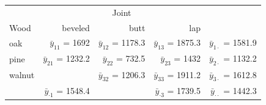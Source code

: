 \documentclass[addpoints]{examsetup}\usepackage[]{graphicx}\usepackage[]{color}
\begin{document}
\begin{questions}
\begin{table}[h]
\centering
\begin{tabular}{lrrrr}
   & \multicolumn{3}{c}{Joint} & \\
\cline{2-4}
   Wood   & beveled                                                 & butt                                                   & lap \\ \cline{1-4}\cline{1-4}
   oak    &    $\bar{y}_{11}$ = 1692               & $\bar{y}_{12}$ = 1178.3                 & $\bar{y}_{13}$ = 1875.3               &  $\bar{y}_{1 \cdot}$ = 1581.9 \\
   pine   &    $\bar{y}_{21}$ = 1232.2               & $\bar{y}_{22}$ = 732.5                 & $\bar{y}_{23}$ = 1432               &  $\bar{y}_{2 \cdot}$ = 1132.2 \\
   walnut &                                                         & $\bar{y}_{32}$ = 1206.3                 & $\bar{y}_{33}$ = 1911.2               &  $\bar{y}_{3 \cdot}$ = 1612.8 \\
\cline{1-4}
          &    $\bar{y}_{\cdot 1}$ = 1548.4        &                                                        & $\bar{y}_{\cdot 3}$ = 1739.5         &    $\bar{y}_{\cdot \cdot}$ = 1442.3 \\
\end{tabular}
\end{table}


\end{questions}
\end{document}
